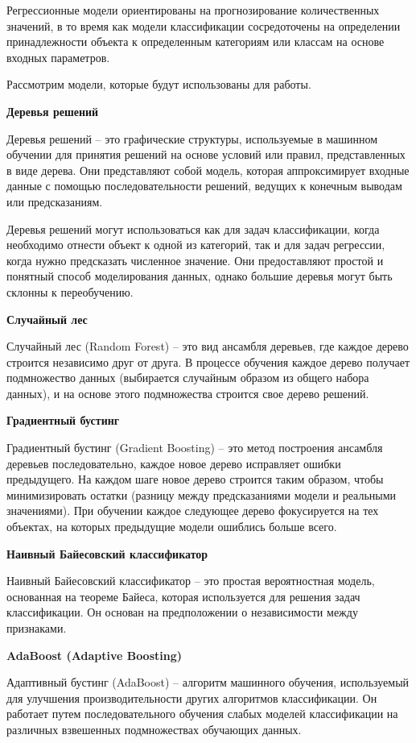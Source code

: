 Регрессионные модели ориентированы на прогнозирование количественных значений, в то время как модели классификации сосредоточены на определении принадлежности объекта к определенным категориям или классам на основе входных параметров. 

Рассмотрим модели, которые будут использованы для работы.

\textbf{Деревья решений}

Деревья решений -- это графические структуры, используемые в машинном обучении для принятия решений на основе условий или правил, представленных в виде дерева. Они представляют собой модель, которая аппроксимирует входные данные с помощью последовательности решений, ведущих к конечным выводам или предсказаниям.

Деревья решений могут использоваться как для задач классификации, когда необходимо отнести объект к одной из категорий, так и для задач регрессии, когда нужно предсказать численное значение. Они предоставляют простой и понятный способ моделирования данных, однако большие деревья могут быть склонны к переобучению.

\textbf{Случайный лес}

Случайный лес (Random Forest) -- это вид ансамбля деревьев, где каждое дерево строится независимо друг от друга. В процессе обучения каждое дерево получает подмножество данных (выбирается случайным образом из общего набора данных), и на основе этого подмножества строится свое дерево решений. 

\textbf{Градиентный бустинг}

Градиентный бустинг (Gradient Boosting) -- это метод построения ансамбля деревьев последовательно, каждое новое дерево исправляет ошибки предыдущего. На каждом шаге новое дерево строится таким образом, чтобы минимизировать остатки (разницу между предсказаниями модели и реальными значениями). При обучении каждое следующее дерево фокусируется на тех объектах, на которых предыдущие модели ошиблись больше всего. 

\textbf{Наивный Байесовский классификатор}

Наивный Байесовский классификатор -- это простая вероятностная модель, основанная на теореме Байеса, которая используется для решения задач классификации. Он основан на предположении о независимости между признаками. 

\textbf{AdaBoost (Adaptive Boosting)}

Адаптивный бустинг (AdaBoost) -- алгоритм машинного обучения, используемый для улучшения производительности других алгоритмов классификации. Он работает путем последовательного обучения слабых моделей классификации на различных взвешенных подмножествах обучающих данных.
